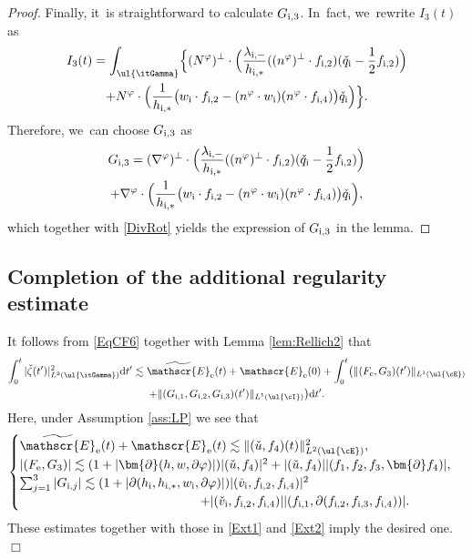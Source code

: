 \begin{proof}
Finally, it~is straightforward to calculate $G_{{\rm i},3}$. In~fact, we~rewrite $I_3(t)$ as
\begin{multline*}
I_3(t)
= \int_{\ul{\itGamma}}\Bigl\{
(N^\varphi)^\perp\cdot \Bigl(\frac{\lambda_{{\rm i},-}}{h_{{\rm i},*}} ((n^\varphi)^\perp\cdot f_{{\rm i},2})(\check{q}_\mathrm{i}-\frac12 f_{{\rm i},2}) \Bigr) \\
+ N^\varphi\cdot \Bigl(\frac{1}{h_{{\rm i},*}}\bigl(w_\mathrm{i}\cdot f_{{\rm i},2}-(n^\varphi\cdot w_\mathrm{i})(n^\varphi\cdot f_{{\rm i},4})
\bigr) \check{q}_\mathrm{i} \Bigr) \Bigr\}.
\end{multline*}
Therefore, we~can choose $G_{{\rm i},3}$ as
\begin{multline*}
G_{{\rm i},3}
= (\nabla^\varphi)^\perp\cdot \Bigl(\frac{\lambda_{{\rm i},-}}{h_{{\rm i},*}} ((n^\varphi)^\perp\cdot f_{{\rm i},2})
(\check{q}_\mathrm{i}-\frac12 f_{{\rm i},2}) \Bigr) \\
+ \nabla^\varphi\cdot \Bigl(\frac{1}{h_{{\rm i},*}}
\bigl(w_\mathrm{i}\cdot f_{{\rm i},2}-(n^\varphi\cdot w_\mathrm{i})(n^\varphi\cdot f_{{\rm i},4}) \bigr)\check{q}_\mathrm{i} \Bigr),
\end{multline*}
which together with \eqref{DivRot} yields the expression of $G_{{\rm i},3}$ in the lemma.
\end{proof}

\subsection{Completion of the additional regularity estimate}
It follows from \eqref{EqCF6} together with Lemma \ref{lem:Rellich2} that
\begin{multline*}
\int_0^t|\check{\zeta}(t')|_{L^2(\ul{\itGamma})}^2\mathrm{d}t'
\lesssim \widetilde{\mathscr{E}}_\mathrm{e}(t) + \mathscr{E}_\mathrm{e}(0) + \int_0^t \bigl(\|(F_\mathrm{e},G_3)(t')\|_{L^1(\ul{\cE})} \\
+ \|(G_{{\rm i},1},G_{{\rm i},2},G_{{\rm i},3})(t')\|_{L^1(\ul{\cI})} \bigr){\rm d}t'.
\end{multline*}
Here, under Assumption \ref{ass:LP} we see that
\[
\begin{cases}
\widetilde{\mathscr{E}}_\mathrm{e}(t) + \mathscr{E}_\mathrm{e}(t) \lesssim \|(\check{u},f_4)(t)\|_{L^2(\ul{\cE})}^2, \\
|(F_\mathrm{e},G_3)| \lesssim (1+|\bm{\partial}(h,w,\partial\varphi)|)|(\check{u},f_4)|^2 + |(\check{u},f_4)||(f_1,f_2,f_3,\bm{\partial}f_4)|, \\
\sum_{j=1}^3|G_{{\rm i},j}| \lesssim (1+|\partial(h_\mathrm{i},h_{{\rm i},*},w_\mathrm{i},\partial\varphi)|)|(\check{v}_\mathrm{i},f_{{\rm i},2},f_{{\rm i},4})|^2 \\
\hspace*{5cm}
+ |(\check{v}_\mathrm{i},f_{{\rm i},2},f_{{\rm i},4})||(f_{{\rm i},1},\partial(f_{{\rm i},2},f_{{\rm i},3},f_{{\rm i},4}))|.
\end{cases}
\]
These estimates together with those in \eqref{Ext1} and \eqref{Ext2} imply the desired one.
\hfill$\Box$


